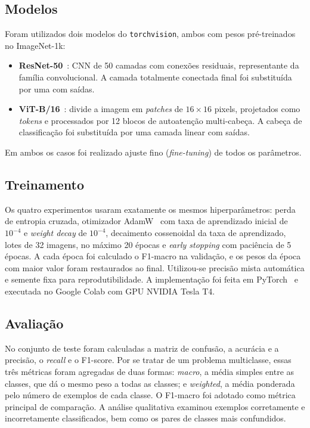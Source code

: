 \documentclass[conference]{IEEEtran}
\begin{document}
\subsection{Modelos}
Foram utilizados dois modelos do \texttt{torchvision}, ambos com pesos pré-treinados no ImageNet-1k:
\begin{itemize}
\item \textbf{ResNet-50}~\cite{he2016resnet}: CNN de 50 camadas com conexões residuais, representante da família convolucional. A camada totalmente conectada final foi substituída por uma com \NClasses{} saídas.
\item \textbf{ViT-B/16}~\cite{dosovitskiy2021vit}: divide a imagem em \textit{patches} de $16\times16$ pixels, projetados como \textit{tokens} e processados por 12 blocos de autoatenção multi-cabeça. A cabeça de classificação foi substituída por uma camada linear com \NClasses{} saídas.
\end{itemize}
Em ambos os casos foi realizado ajuste fino (\textit{fine-tuning}) de todos os parâmetros.

\subsection{Treinamento}
Os quatro experimentos usaram exatamente os mesmos hiperparâmetros: perda de entropia cruzada, otimizador AdamW~\cite{loshchilov2019adamw} com taxa de aprendizado inicial de $10^{-4}$ e \textit{weight decay} de $10^{-4}$, decaimento cossenoidal da taxa de aprendizado, lotes de 32 imagens, no máximo 20 épocas e \textit{early stopping} com paciência de 5 épocas. A cada época foi calculado o F1-macro na validação, e os pesos da época com maior valor foram restaurados ao final. Utilizou-se precisão mista automática e semente fixa para reprodutibilidade. A implementação foi feita em PyTorch~\cite{paszke2019pytorch} e executada no Google Colab com GPU NVIDIA Tesla T4.

\subsection{Avaliação}
No conjunto de teste foram calculadas a matriz de confusão, a acurácia e a precisão, o \textit{recall} e o F1-score. Por se tratar de um problema multiclasse, essas três métricas foram agregadas de duas formas: \textit{macro}, a média simples entre as classes, que dá o mesmo peso a todas as classes; e \textit{weighted}, a média ponderada pelo número de exemplos de cada classe. O F1-macro foi adotado como métrica principal de comparação. A análise qualitativa examinou exemplos corretamente e incorretamente classificados, bem como os pares de classes mais confundidos.
\end{document}
